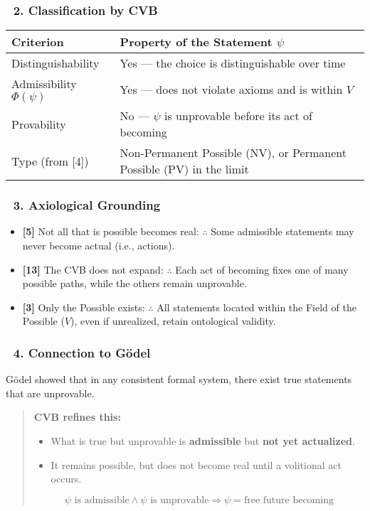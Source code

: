 \documentclass[12pt]{article}
\begin{document}
\subsubsection*{🔹 2. Classification by CVB}

\begin{tabular}{|l|l|}
\hline
\textbf{Criterion} & \textbf{Property of the Statement $\psi$} \\
\hline
Distinguishability & Yes — the choice is distinguishable over time \\
Admissibility $\Phi(\psi)$ & Yes — does not violate axioms and is within $V$ \\
Provability & No — $\psi$ is unprovable before its act of becoming \\
Type (from [4]) & Non-Permanent Possible (NV), or Permanent Possible (PV) in the limit \\
\hline
\end{tabular}

\subsubsection*{🔹 3. Axiological Grounding}

\begin{itemize}
\item \textbf{[5]} Not all that is possible becomes real: $\therefore$ Some admissible statements may never become actual (i.e., actions).
\item \textbf{[13]} The CVB does not expand: $\therefore$ Each act of becoming fixes one of many possible paths, while the others remain unprovable.
\item \textbf{[3]} Only the Possible exists: $\therefore$ All statements located within the Field of the Possible ($V$), even if unrealized, retain ontological validity.
\end{itemize}

\subsubsection*{🔹 4. Connection to Gödel}

Gödel showed that in any consistent formal system, there exist true statements that are unprovable.

\begin{quote}
\textbf{CVB refines this:}
\begin{itemize}
\item What is true but unprovable is \textbf{admissible} but \textbf{not yet actualized}.
\item It remains possible, but does not become real until a volitional act occurs.
\end{itemize}

\[
\psi \text{ is admissible} \land \psi \text{ is unprovable} \Rightarrow \psi = \text{free future becoming}
\]
\end{quote}
\end{document}
